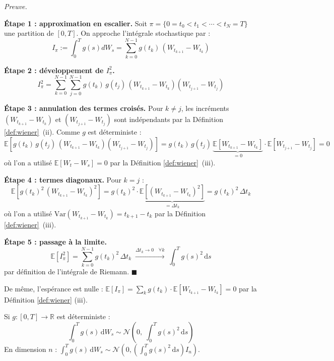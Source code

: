 \documentclass[12pt]{article}
\renewcommand{\qedsymbol}{$\blacksquare$}
\renewenvironment{proof}[1][\proofname]{%
  \par\medskip\noindent
  \textit{\color{proofgray}#1.}\enspace\ignorespaces
}{\hfill\qedsymbol\par\medskip}
\renewcommand{\proofname}{Preuve}
\begin{document}
\begin{proof}

\textbf{Étape 1 : approximation en escalier.} Soit $\pi = \{0 = t_0 < t_1 < \cdots < t_N = T\}$ une partition de $[0,T]$. On approche l'intégrale stochastique par :
\[
I_\pi :=\int_0^T g(s) dW_s = \sum_{k=0}^{N-1} g(t_k)\,(W_{t_{k+1}} - W_{t_k})
\]

\textbf{Étape 2 : développement de $I_\pi^2$.}
\[
I_\pi^2 = \sum_{k=0}^{N-1} \sum_{j=0}^{N-1} g(t_k)\,g(t_j)\,(W_{t_{k+1}} - W_{t_k})(W_{t_{j+1}} - W_{t_j})
\]

\textbf{Étape 3 : annulation des termes croisés.} Pour $k \neq j$, les incréments $(W_{t_{k+1}} - W_{t_k})$ et $(W_{t_{j+1}} - W_{t_j})$ sont indépendants par la Définition \ref{def:wiener}~(ii). Comme $g$ est déterministe :
\[
\mathbb{E}\!\left[g(t_k)\,g(t_j)\,(W_{t_{k+1}} - W_{t_k})(W_{t_{j+1}} - W_{t_j})\right] = g(t_k)\,g(t_j)\, \underbrace{\mathbb{E}[W_{t_{k+1}} - W_{t_k}]}_{= 0} \cdot \mathbb{E}[W_{t_{j+1}} - W_{t_j}] = 0
\]
où l'on a utilisé $\mathbb{E}[W_t - W_s] = 0$ par la Définition \ref{def:wiener}~(iii).

\textbf{Étape 4 : termes diagonaux.} Pour $k = j$ :
\[
\mathbb{E}\!\left[g(t_k)^2\,(W_{t_{k+1}} - W_{t_k})^2\right] = g(t_k)^2 \cdot \underbrace{\mathbb{E}\!\left[(W_{t_{k+1}} - W_{t_k})^2\right]}_{= \Delta t_k} = g(t_k)^2\, \Delta t_k
\]
où l'on a utilisé $\mathrm{Var}(W_{t_{k+1}} - W_{t_k}) = t_{k+1} - t_k$ par la Définition \ref{def:wiener}~(iii).

\textbf{Étape 5 : passage à la limite.}
\[
\mathbb{E}[I_\pi^2] = \sum_{k=0}^{N-1} g(t_k)^2\, \Delta t_k \;\xrightarrow{ \Delta t_k \to 0 \quad \forall k }\; \int_0^T g(s)^2\, \mathrm{d}s
\]
par définition de l'intégrale de Riemann.
\end{proof}



De même, l'espérance est nulle : $\mathbb{E}[I_\pi] = \sum_k g(t_k) \cdot \mathbb{E}[W_{t_{k+1}} - W_{t_k}] = 0$ par la Définition \ref{def:wiener} (iii).

\begin{propositionbox}
\label{prop:gauss}
Si $g : [0,T] \to \mathbb{R}$ est déterministe :
\begin{equation}
    \int_0^T g(s)\, \mathrm{d}W_s \sim \mathcal{N}\!\left(0,\; \int_0^T g(s)^2\, \mathrm{d}s\right)
\end{equation}
En dimension $n$ : $\int_0^T g(s)\, \mathrm{d}W_s \sim \mathcal{N}\!\left(0, \left(\int_0^T g(s)^2\, \mathrm{d}s\right) I_n\right)$.
\end{propositionbox}
\end{document}
